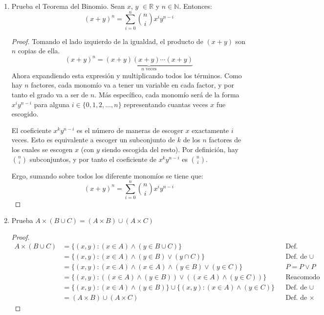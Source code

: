 \documentclass[11pt,letterpaper]{report}
\newcommand{\N}{\mathbb{N}}
\newcommand{\R}{\mathbb{R}}
\begin{document}
\begin{enumerate}
\begin{enumerate}
    \item $A \cap (B \setminus C) = (A \cap B) \setminus (A \cap C)$
    \begin{proof}
        TODO
    \end{proof}
\end{enumerate}

\item Prueba el Teorema del Binomio. Sean $x$, $y$ $\in \R$ y $n \in \N$. Entonces:
\[
    (x+y)^n = \sum_{i=0}^{n} \binom{n}{i} x^i y^{n-i}
\]
\begin{proof}
    Tomando el lado izquierdo de la igualdad, el producto de $(x+y)$ son $n$ copias de ella.
    \[
        (x+y)^n = \underbrace{(x+y)(x+y) \cdots (x+y)}_{n \text{ veces}}
    \]
    Ahora expandiendo esta expresión y multiplicando todos los términos. Como hay $n$ factores,
    cada monomío va a tener un variable en cada factor, y por tanto el grado va a ser de $n$.
    Más específico, cada monomío será de la forma $x^i y^{n-i}$ para alguna
    $i \in \{ 0,1,2, \ldots, n \}$ representando cuantas veces $x$ fue escogido.

    El coeficiente $x^k y^{n-i}$ es el número de maneras de escoger $x$ exactamente $i$ veces.
    Esto es equivalente a escoger un subconjunto de $k$ de los $n$ factores de los cuales se
    escogen $x$ (con $y$ siendo escogida del resto). Por definición, hay $\binom{n}{i}$
    subconjuntos, y por tanto el coeficiente de $x^k y^{n-i}$ es $\binom{n}{i}$.
    
    Ergo, sumando sobre todos los diferente monomíos se tiene que:
    $$(x+y)^n = \sum_{i=0}^{n} \binom{n}{i} x^i y^{n-i}$$
\end{proof}

\item Prueba $A \times (B \cup C) = (A \times B) \cup (A \times C)$
\begin{proof}
    \begin{align*}
        A \times (B \cup C)
        &= \{ (x,y): (x \in A) \land (y \in B \cup C)\} && \text{Def. produto cartesiano}\\
        &= \{ (x,y): (x \in A) \land (y \in B) \lor (y \cap C)\} && \text{Def. de $\cup$}\\
        &= \{ (x,y): (x \in A) \land (x \in A) \land (y \in B) \lor (y \in C)\} && P = P \lor P\\
        &= \{ (x,y): ((x \in A) \land (y \in B)) \lor ((x \in A) \land (y \in C)) \} && \text{Reacomodo}\\
        &= \{ (x,y): (x \in A) \land (y \in B) \} \cup \{ (x,y): (x \in A) \land (y \in C) \} && \text{Def. de $\cup$}\\
        &= (A \times B) \cup (A \times C) && \text{Def. de $\times$} 
    \end{align*}
\end{proof}


\end{enumerate}
\end{document}
